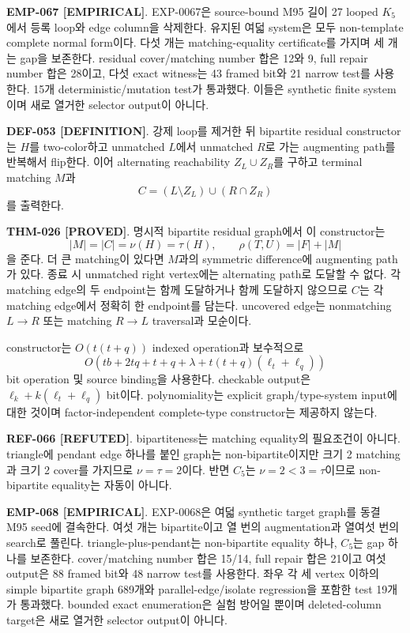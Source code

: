 \documentclass[11pt]{article}
\newcommand{\claimstatus}[2]{\textbf{#1 [#2]}}
\begin{document}
\claimstatus{EMP-067}{EMPIRICAL}. EXP-0067은 source-bound M95 길이 27
looped \(K_5\)에서 등록 loop와 edge column을 삭제한다. 유지된 여덟
system은 모두 non-template complete normal form이다. 다섯 개는
matching-equality certificate를 가지며 세 개는 gap을 보존한다.
residual cover/matching number 합은 12와 9, full repair number 합은
28이고, 다섯 exact witness는 43 framed bit와 21 narrow test를
사용한다. 15개 deterministic/mutation test가 통과했다. 이들은
synthetic finite system이며 새로 열거한 selector output이 아니다.

\claimstatus{DEF-053}{DEFINITION}. 강제 loop를 제거한 뒤 bipartite
residual constructor는 \(H\)를 two-color하고 unmatched \(L\)에서
unmatched \(R\)로 가는 augmenting path를 반복해서 flip한다. 이어
alternating reachability \(Z_L\cup Z_R\)를 구하고 terminal matching
\(M\)과
\[
 C=(L\setminus Z_L)\cup(R\cap Z_R)
\]
를 출력한다.

\claimstatus{THM-026}{PROVED}. 명시적 bipartite residual graph에서 이
constructor는
\[
 |M|=|C|=\nu(H)=\tau(H),\qquad
 \rho(T,U)=|F|+|M|
\]
을 준다. 더 큰 matching이 있다면 \(M\)과의 symmetric difference에
augmenting path가 있다. 종료 시 unmatched right vertex에는
alternating path로 도달할 수 없다. 각 matching edge의 두 endpoint는
함께 도달하거나 함께 도달하지 않으므로 \(C\)는 각 matching edge에서
정확히 한 endpoint를 담는다. uncovered edge는 nonmatching
\(L\to R\) 또는 matching \(R\to L\) traversal과 모순이다.

constructor는 \(O(t(t+q))\) indexed operation과 보수적으로
\[
 O(tb+2tq+t+q+\lambda+t(t+q)(\ell_t+\ell_q))
\]
bit operation 및 source binding을 사용한다. checkable output은
\(\ell_k+k(\ell_t+\ell_q)\) bit이다. polynomiality는 explicit
graph/type-system input에 대한 것이며 factor-independent complete-type
constructor는 제공하지 않는다.

\claimstatus{REF-066}{REFUTED}. bipartiteness는 matching equality의
필요조건이 아니다. triangle에 pendant edge 하나를 붙인 graph는
non-bipartite이지만 크기 2 matching과 크기 2 cover를 가지므로
\(\nu=\tau=2\)이다. 반면 \(C_5\)는 \(\nu=2<3=\tau\)이므로
non-bipartite equality는 자동이 아니다.

\claimstatus{EMP-068}{EMPIRICAL}. EXP-0068은 여덟 synthetic target
graph를 동결 M95 seed에 결속한다. 여섯 개는 bipartite이고 열 번의
augmentation과 열여섯 번의 search로 풀린다. triangle-plus-pendant는
non-bipartite equality 하나, \(C_5\)는 gap 하나를 보존한다.
cover/matching number 합은 15/14, full repair 합은 21이고 여섯 output은
88 framed bit와 48 narrow test를 사용한다. 좌우 각 세 vertex 이하의
simple bipartite graph 689개와 parallel-edge/isolate regression을 포함한
test 19개가 통과했다. bounded exact enumeration은 실험 방어일 뿐이며
deleted-column target은 새로 열거한 selector output이 아니다.
\end{document}
